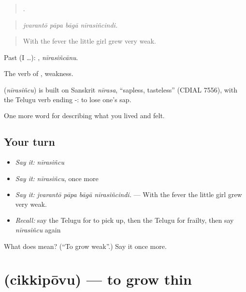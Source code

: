 \begin{quote}
   .
\end{quote}

\begin{quote}
\emph{jvarantō pāpa bāgā nīrasiñcindi.}
\end{quote}

\begin{quote}
With the fever the little girl grew very weak.
\end{quote}

Past (I …): , \emph{nīrasiñcānu}.

The verb of , weakness.

\begin{cousinweb}
\textbf{} (\emph{nīrasiñcu}) is built on Sanskrit \emph{nīrasa}, \textquotedblleft{}sapless, tasteless\textquotedblright{} (CDIAL 7556), with the Telugu verb ending -: to lose one's sap.
\end{cousinweb}

\begin{grammarlens}[title={What you've built}]
One more word for describing what you lived and felt.
\end{grammarlens}

\subsection*{Your turn}
\begin{itemize}
\raggedright
  \item \emph{Say it:} \emph{nīrasiñcu}
  \item \emph{Say it:} \emph{nīrasiñcu}, once more
  \item \emph{Say it:} \emph{jvarantō pāpa bāgā nīrasiñcindi.} — With the fever the little girl grew very weak.
  \item \emph{Recall:} say the Telugu for to pick up, then the Telugu for frailty, then say \emph{nīrasiñcu} again
\end{itemize}

\begin{tcolorbox}[breakable,colback=teal!4,colframe=teal!35!black,title={Before you move on}]
What does  mean? (\textquotedblleft{}To grow weak\textquotedblright{}.) Say it once more.
\end{tcolorbox}
\section[\texorpdfstring{\te{చిక్కిపోవు} (cikkipōvu)}{చిక్కిపోవు (cikkipōvu)}]{ (cikkipōvu) — to grow thin}

